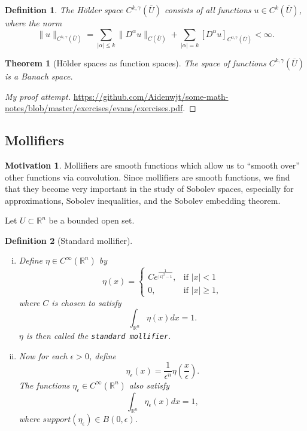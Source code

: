 \documentclass[11pt]{article}
\newtheorem{theorem}{Theorem}
\newtheorem{definition}{Definition}
\theoremstyle{definition}
\newtheorem*{motivation}{Motivation}
\begin{document}
\begin{definition}
The H\"{o}lder space $C^{k,\gamma}(\overline{U})$ consists of all functions $u \in C^k(\overline{U})$,
where the norm
\[\|u\|_{C^{k,\gamma}(\overline{U})} = \sum_{|\alpha| \leq k}\|D^{\alpha}u\|_{C(\overline{U})} + \sum_{|\alpha| = k}[D^{\alpha}u]_{C^{0,\gamma}(\overline{U})} < \infty.\]
\end{definition}

\begin{theorem}[H\"{o}lder spaces as function spaces]
The space of functions $C^{k,\gamma}(\overline{U})$ is a Banach space.
\end{theorem}
\begin{proof}[My proof attempt]
\url{https://github.com/Aidenwjt/some-math-notes/blob/master/exercises/evans/exercises.pdf}.
\end{proof}

\newpage

\subsection{Mollifiers}
\begin{motivation}
	Mollifiers are smooth functions which allow us to ``smooth over'' other functions via convolution.
	Since mollifiers are smooth functions, we find that they become very important in the study of Sobolev spaces,
	especially for approximations, Sobolev inequalities, and the Sobolev embedding theorem.
\end{motivation}
Let $U \subset \mathbb{R}^n$ be a bounded open set.
\begin{definition}[Standard mollifier]~ 
	\begin{enumerate}[(i)]
		\item Define $\eta \in C^{\infty}(\mathbb{R}^n)$ by
			\begin{equation*}
				\eta(x) =
				\begin{cases}
					C e^{\frac{1}{|x|^2 - 1}},& \text{if } |x| < 1 \\
					0,& \text{if } |x| \geq 1,
				\end{cases}
			\end{equation*}
			where $C$ is chosen to satisfy
			\begin{equation*}
				\int_{\mathbb{R}^n}{\eta(x)dx} = 1.
			\end{equation*}
			$\eta$ is then called the \texttt{standard mollifier}.
		\item Now for each $\epsilon > 0$, define
			\begin{equation*}
				\eta_{\epsilon}(x) = \frac{1}{\epsilon^n}\eta\left(\frac{x}{\epsilon}\right).
			\end{equation*}
			The functions $\eta_{\epsilon} \in C^{\infty}(\mathbb{R}^n)$ also satisfy
			\begin{equation*}
				\int_{\mathbb{R}^n}{\eta_{\epsilon}(x)dx} = 1,
			\end{equation*}
			where $support(\eta_{\epsilon}) \in B(0,\epsilon)$.
	\end{enumerate}
\end{definition}
\end{document}
